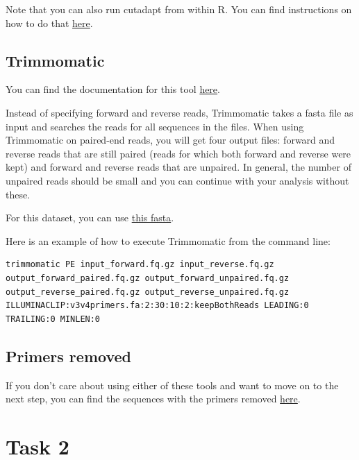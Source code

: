 \documentclass[
]{book}
\begin{document}
Note that you can also run cutadapt from within R. You can find instructions on how to do that \href{https://benjjneb.github.io/dada2/ITS_workflow.html}{here}.

\hypertarget{trimmomatic}{%
\subsection{Trimmomatic}\label{trimmomatic}}

You can find the documentation for this tool \href{http://www.usadellab.org/cms/?page=trimmomatic}{here}.

Instead of specifying forward and reverse reads, Trimmomatic takes a fasta file as input and searches the reads for all sequences in the files. When using Trimmomatic on paired-end reads, you will get four output files: forward and reverse reads that are still paired (reads for which both forward and reverse were kept) and forward and reverse reads that are unpaired. In general, the number of unpaired reads should be small and you can continue with your analysis without these.

For this dataset, you can use \href{https://www.dropbox.com/s/wc2kihxfep23ycw/v3v4primers.fa?dl=0}{this fasta}.

Here is an example of how to execute Trimmomatic from the command line:

\begin{verbatim}
trimmomatic PE input_forward.fq.gz input_reverse.fq.gz output_forward_paired.fq.gz output_forward_unpaired.fq.gz output_reverse_paired.fq.gz output_reverse_unpaired.fq.gz ILLUMINACLIP:v3v4primers.fa:2:30:10:2:keepBothReads LEADING:0 TRAILING:0 MINLEN:0
\end{verbatim}

\hypertarget{primers-removed}{%
\subsection{Primers removed}\label{primers-removed}}

If you don't care about using either of these tools and want to move on to the next step, you can find the sequences with the primers removed \href{https://www.dropbox.com/s/qrf24anx9zllp9t/trimmed_data.zip?dl=0}{here}.

\hypertarget{task-2}{%
\section{Task 2}\label{task-2}}
\end{document}
